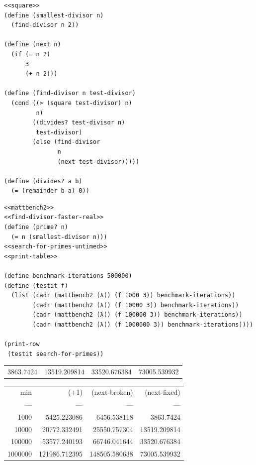 \documentclass[final,fleqn,titlepage]{article}
\begin{document}
\begin{verbatim}
<<square>>
(define (smallest-divisor n)
  (find-divisor n 2))

(define (next n)
  (if (= n 2)
      3
      (+ n 2)))

(define (find-divisor n test-divisor)
  (cond ((> (square test-divisor) n) 
         n)
        ((divides? test-divisor n) 
         test-divisor)
        (else (find-divisor 
               n 
               (next test-divisor)))))

(define (divides? a b)
  (= (remainder b a) 0))
\end{verbatim}
\begin{verbatim}
<<mattbench2>>
<<find-divisor-faster-real>>
(define (prime? n)
  (= n (smallest-divisor n)))
<<search-for-primes-untimed>>
<<print-table>>

(define benchmark-iterations 500000)
(define (testit f)
  (list (cadr (mattbench2 (λ() (f 1000 3)) benchmark-iterations))
        (cadr (mattbench2 (λ() (f 10000 3)) benchmark-iterations))
        (cadr (mattbench2 (λ() (f 100000 3)) benchmark-iterations))
        (cadr (mattbench2 (λ() (f 1000000 3)) benchmark-iterations))))

(print-row
 (testit search-for-primes))
\end{verbatim}

\begin{table}[htbp]
\label{1-22-smdff}
\centering
\begin{tabular}{rrrr}
3863.7424 & 13519.209814 & 33520.676384 & 73005.539932\\
\end{tabular}
\end{table}

\begin{center}
\begin{tabular}{rrrr}
min & (+1) & (next-broken) & (next-fixed)\\
--- & --- & --- & ---\\
1000 & 5425.223086 & 6456.538118 & 3863.7424\\
10000 & 20772.332491 & 25550.757304 & 13519.209814\\
100000 & 53577.240193 & 66746.041644 & 33520.676384\\
1000000 & 121986.712395 & 148505.580638 & 73005.539932\\
\end{tabular}
\end{center}
\end{document}
